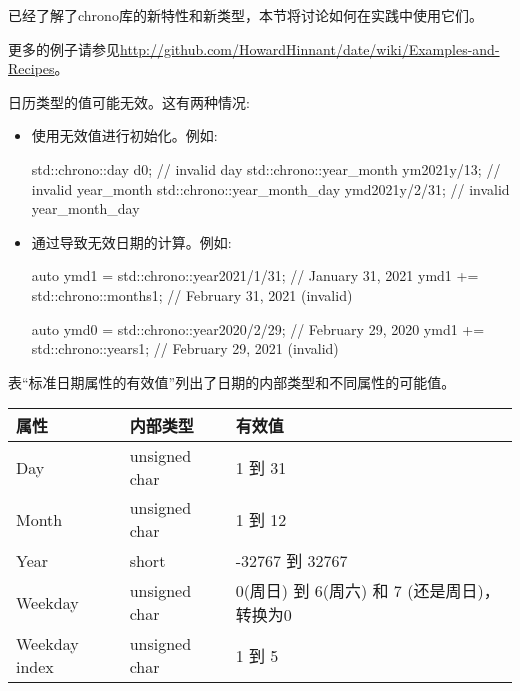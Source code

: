 
已经了解了chrono库的新特性和新类型，本节将讨论如何在实践中使用它们。

更多的例子请参见\url{http://github.com/HowardHinnant/date/wiki/Examples-and-Recipes}。


日历类型的值可能无效。这有两种情况:

\begin{itemize}
\item 
使用无效值进行初始化。例如:

\begin{cpp}
std::chrono::day d{0}; // invalid day
std::chrono::year_month ym{2021y/13}; // invalid year_month
std::chrono::year_month_day ymd{2021y/2/31}; // invalid year_month_day
\end{cpp}

\item 
通过导致无效日期的计算。例如:

\begin{cpp}
auto ymd1 = std::chrono::year{2021}/1/31; // January 31, 2021
ymd1 += std::chrono::months{1}; // February 31, 2021 (invalid)

auto ymd0 = std::chrono::year{2020}/2/29; // February 29, 2020
ymd1 += std::chrono::years{1}; // February 29, 2021 (invalid)
\end{cpp}
\end{itemize}

表“标准日期属性的有效值”列出了日期的内部类型和不同属性的可能值。

\begin{longtable}[c]{|l|l|l|}
\hline
\textbf{属性} & \textbf{内部类型} & \textbf{有效值}                                                  \\ \hline
\endfirsthead
%
\endhead
%
Day           & unsigned char & 1 到 31         \\ \hline
Month         & unsigned char & 1 到 12         \\ \hline
Year          & short         & -32767 到 32767 \\ \hline
Weekday            & unsigned char          & 0(周日) 到 6(周六) 和 7 (还是周日)，转换为0\\ \hline
Weekday index & unsigned char & 1 到 5          \\ \hline
\end{longtable}

